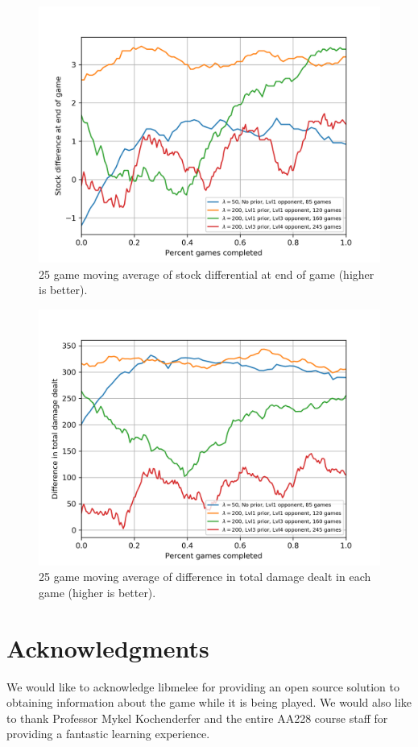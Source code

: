 \documentclass[journal]{new-aiaa}
\begin{document}
\begin{figure}[!htb]
\centering
	\includegraphics[width=120mm]{stocks.png}
	\caption{25 game moving average of stock differential at end of game (higher is better).\label{stocks}}
\end{figure}

\begin{figure}[!htb]
\centering
	\includegraphics[width=120mm]{damage.png}
	\caption{25 game moving average of difference in total damage dealt in each game (higher is better). \label{damage}}
\end{figure}


%
%
\section*{Acknowledgments}

We would like to acknowledge libmelee for providing an open source solution to obtaining information about the game while it is being played. We would also like to thank Professor Mykel Kochenderfer and the entire AA228 course staff for providing a fantastic learning experience. 

\newpage

\end{document}
